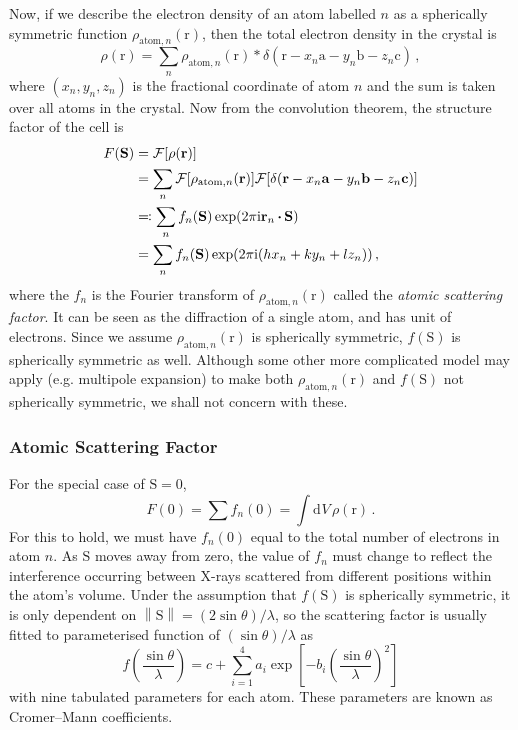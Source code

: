 \documentclass{article}
\theoremstyle{plain}\theoremheaderfont{\normalfont\itshape}\theorembodyfont{\rmfamily}\theoremseparator{.}\newtheorem*{rem}{Remark}\newtheorem*{ex}{Example}\newtheorem*{proof}{Proof}\newtheorem*{altp}{Alternative proof}
\theoremstyle{plain}\theoremheaderfont{\normalfont\bfseries}\theorembodyfont{\rmfamily}\theoremseparator{.}\newtheorem{thm}{Theorem}[section]\newtheorem{lem}[thm]{Lemma}\newtheorem{prop}[thm]{Proposition}\newtheorem*{cor}{Corollary}\newtheorem{defn}[thm]{Definition}\newtheorem{clm}[thm]{Claim}\newtheorem{clminproof}{Claim}\newtheorem*{law}{Law}\newtheorem{pos}[thm]{Postulate}
\theoremstyle{break}\theoremheaderfont{\normalfont\itshape}\theorembodyfont{\rmfamily}\theoremseparator{.\medskip}\newtheorem*{proofskip}{Proof}\newtheorem*{exs}{Examples}\newtheorem*{rems}{Remarks}
\theoremstyle{break}\theoremheaderfont{\normalfont\bfseries}\theorembodyfont{\rmfamily}\theoremseparator{.\medskip}\newtheorem{lemskip}[thm]{Lemma}\newtheorem{defnskip}[thm]{Definition}\newtheorem{propskip}[thm]{Proposition}\newtheorem{thmskip}[thm]{Theorem}
\numberwithin{equation}{section}
\newcommand{\ii}{\mathrm{i}}
\newcommand{\dd}[2][]{\mathrm{d}^{#1} #2\,}
\newcommand{\vb}[1]{\bm{\mathrm{#1}}}
\newcommand{\vdot}{\,\bm{\mathrm{\cdot}}\,}
\newcommand{\norm}[1]{\left\| #1 \right\|}
\begin{document}
    Now, if we describe the electron density of an atom labelled \(n\) as a spherically symmetric function \(\rho_{\text{atom}, n}(\vb{r})\), then the total electron density in the crystal is
    \begin{equation}
        \rho(\vb{r})=\sum_n \rho_{\text{atom},n}(\vb{r})*\delta(\vb{r}-x_n\vb{a}-y_n\vb{b}-z_n\vb{c})\,,
    \end{equation}
    where \((x_n,y_n,z_n)\) is the fractional coordinate of atom \(n\) and the sum is taken over all atoms in the crystal. Now from the convolution theorem, the structure factor of the cell is
    \begin{align}
        F(\vb{S})&=\mathcal{F}[\rho(\vb{r})]\notag\\
        &=\sum_n\mathcal{F}[\rho_{\text{atom},n}(\vb{r})]\mathcal{F}[\delta(\vb{r}-x_n\vb{a}-y_n\vb{b}-z_n\vb{c})]\notag\\
        &\eqqcolon \sum_n f_n(\vb{S})\exp(2\pi \ii\vb{r}_n\vdot\vb{S})\notag\\
        &=\sum_n f_n(\vb{S})\exp(2\pi \ii(hx_n+ky_n+lz_n))\,,
    \end{align}
    where the \(f_n\) is the Fourier transform of \(\rho_{\text{atom},n}(\vb{r})\) called the \textit{atomic scattering factor}. It can be seen as the diffraction of a single atom, and has unit of electrons. Since we assume \(\rho_{\text{atom},n}(\vb{r})\) is spherically symmetric, \(f(\vb{S})\) is spherically symmetric as well. Although some other more complicated model may apply (e.g. multipole expansion) to make both \(\rho_{\text{atom},n}(\vb{r})\) and \(f(\vb{S})\) not spherically symmetric, we shall not concern with these.

    \subsubsection{Atomic Scattering Factor}
    For the special case of \(\vb{S}=\vb{0}\),
    \begin{equation}
        F(\vb{0})=\sum f_n(\vb{0})=\int\dd{V}\rho(\vb{r})\,.
    \end{equation}
    For this to hold, we must have \(f_n(\vb{0})\) equal to the total number of electrons in atom \(n\). As \(\vb{S}\) moves away from zero, the value of \(f_n\) must change to reflect the interference occurring between X-rays scattered from different positions within the atom's volume. Under the assumption that \(f(\vb{S})\) is spherically symmetric, it is only dependent on \(\norm{\vb{S}}=(2\sin\theta)/\lambda\), so the scattering factor is usually fitted to parameterised function of \((\sin\theta)/\lambda\) as
    \begin{equation}
        f\left(\frac{\sin\theta}{\lambda}\right)=c+\sum_{i=1}^{4}a_i\exp\left[-b_i\left(\frac{\sin\theta}{\lambda}\right)^2\right]
    \end{equation}
    with nine tabulated parameters for each atom. These parameters are known as Cromer--Mann coefficients.
\end{document}
